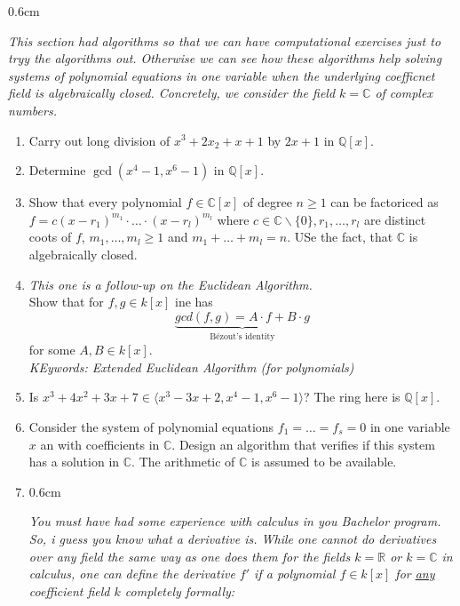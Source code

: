 \begin{exercise}[title = Exercise 1.5.11]
  \begin{addmargin}[0.6cm]{0.6cm}  
    \begin{center}
            \textit{\textcolor{airforceblue}{This section had algorithms so that we can have computational exercises just to tryy the algorithms out. Otherwise 
            we can see how these algorithms help solving systems of polynomial equations in one variable when the underlying coefficnet field is algebraically closed. 
            Concretely, we consider the field $k = \mathbb{C}$} of complex numbers.} \\
    \end{center} 
  \end{addmargin} 

  \begin{enumerate}
    \item Carry out long division of $x^3 + 2x_2 + x + 1$ by $2x+ 1$ in $\mathbb{Q}[x]$. 
    \item Determine $\gcd(x^4 -1, x^6 -1)$ in $\mathbb{Q}[x]$. 
    \item Show that every polynomial $ f \in \mathbb{C}[x]$ of degree $n \geq 1$ can be factoriced as $f = c (x-r_1)^{m_1} \cdot \ldots \cdot (x - r_l)^{m_l}$ where $c \in \mathbb{C}\backslash \{0\}, r_1, \ldots, r_l$ are distinct coots of $f$, 
    $m_1, \ldots, m_l \geq 1$ and $m_1 + \ldots + m_l = n$. USe the fact, that $\mathbb{C}$ is algebraically closed. 
    \item \textit{\textcolor{airforceblue}{This one is a follow-up on the Euclidean Algorithm.}} \\
    Show that for $f,g \in k[x]$ ine has \[\underbrace{gcd(f,g) = A \cdot f+ B  \cdot g}_{\text{Bézout's identity}}\] for some $A,B \in k[x]$.  \\
    \textit{\textcolor{airforceblue}{KEywords: Extended Euclidean Algorithm (for polynomials)}}
    \item Is $x^3 + 4x^2 + 3x + 7 \in \langle x^3-3x + 2, x^4 -1, x^6 -1 \rangle$? The ring here is $\mathbb{Q}[x]$. 
    \item Consider the system of polynomial equations $f_1 = \ldots = f_s = 0$ in one variable $x$ an with coefficients in $\mathbb{C}$. Design an algorithm that verifies 
    if this system has a solution in $\mathbb{C}$. The arithmetic of $\mathbb{C}$ is assumed to be available. 
    \item \begin{addmargin}[0.6cm]{0.6cm}  
    \begin{center}
            \textit{\textcolor{airforceblue}{You must have had some experience with calculus in you Bachelor program. So, i guess you know what a derivative is.
            While one cannot do derivatives over any field the same way as one does them for the fields $k = \mathbb{R}$ or $k = \mathbb{C}$ in calculus, one can 
            define the derivative $f'$ if a polynomial $f \in k[x]$ for \underline{any} coefficient field $k$ completely formally:}} \\
 

\end{center}
\end{addmargin}
\end{enumerate}
\end{exercise}
